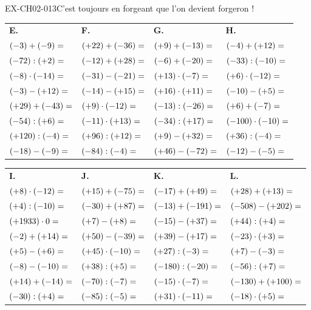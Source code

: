 \begin{exercice}{EX-CH02-013}{C'est toujours en forgeant que l'on devient forgeron !}
{\bigskip
\begin{tabularx}{\linewidth}{*{4}{X}}
\textbf{E.} & \textbf{F.} & \textbf{G.} & \textbf{H.} \\
$(-3)+(-9)= \dotfill$    & $(+22)+(-36)= \dotfill$      & $(+9)+(-13)= \dotfill$      & $(-4)+(+12)= \dotfill$       \\
$(-72):(+2)= \dotfill$   & $(-12)+(+28)= \dotfill$      & $(-6)+(-20)= \dotfill$      & $(-33):(-10)= \dotfill$      \\
$(-8)\cdot(-14)= \dotfill$ & $(-31)-(-21)= \dotfill$    & $(+13)\cdot(-7)= \dotfill$  & $(+6)\cdot(-12)= \dotfill$   \\
$(-3)-(+12)= \dotfill$   & $(-14)-(+15)= \dotfill$      & $(+16)\cdot(+11)= \dotfill$ & $(-10)-(+5)= \dotfill$       \\
$(+29)+(-43)= \dotfill$  & $(+9)\cdot(-12)= \dotfill$   & $(-13):(-26)= \dotfill$     & $(+6)+(-7)= \dotfill$        \\
$(-54):(+6)= \dotfill$   & $(-11)\cdot(+13)= \dotfill$  & $(-34):(+17)= \dotfill$     & $(-100)\cdot(-10)= \dotfill$ \\
$(+120):(-4)= \dotfill$  & $(+96):(+12)= \dotfill$      & $(+9)-(+32)= \dotfill$      & $(+36):(-4)= \dotfill$       \\
$(-18)-(-9)= \dotfill$   & $(-84):(-4)= \dotfill$       & $(+46)-(-72)= \dotfill$     & $(-12)-(-5)= \dotfill$       \\
\end{tabularx}

\bigskip
\begin{tabularx}{\linewidth}{*{4}{X}}
\textbf{I.} & \textbf{J.} & \textbf{K.} & \textbf{L.} \\
$(+8)\cdot(-12)= \dotfill$  & $(+15)+(-75)= \dotfill$   & $(-17)+(+49)= \dotfill$     & $(+28)+(+13)= \dotfill$      \\
$(+4):(-10)= \dotfill$      & $(-30)+(+87)= \dotfill$   & $(-13)+(-191)= \dotfill$    & $(-508)-(+202)= \dotfill$    \\
$(+1933)\cdot 0= \dotfill$  & $(+7)-(+8)= \dotfill$     & $(-15)-(+37)= \dotfill$     & $(+44):(+4)= \dotfill$       \\
$(-2)+(+14)= \dotfill$      & $(+50)-(-39)= \dotfill$   & $(+39)-(+17)= \dotfill$     & $(-23)\cdot(+3)= \dotfill$   \\
$(+5)-(+6)= \dotfill$       & $(+45)\cdot(-10)= \dotfill$ & $(+27):(-3)= \dotfill$    & $(+7)-(-3)= \dotfill$        \\
$(-8)-(-10)= \dotfill$      & $(+38):(+5)= \dotfill$    & $(-180):(-20)= \dotfill$    & $(-56):(+7)= \dotfill$       \\
$(+14)+(-14)= \dotfill$     & $(-70):(-7)= \dotfill$    & $(-15)\cdot(-7)= \dotfill$  & $(-130)+(+100)= \dotfill$    \\
$(-30):(+4)= \dotfill$      & $(-85):(-5)= \dotfill$    & $(+31)\cdot(-11)= \dotfill$ & $(-18)\cdot(+5)= \dotfill$   \\
\end{tabularx}

}
\end{exercice}
